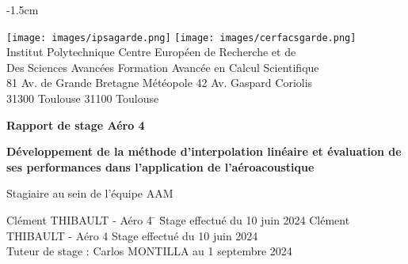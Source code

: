 \begin{titlepage}

    \changepage{3cm}%
           {}%
           {}%
           {}%
           {}%
           {-1.5cm}%
           {}%
           {}%
           {}%

    
    \parindent=0pt
    \texttt{[image: images/ipsagarde.png]}     \texttt{[image: images/cerfacsgarde.png]}\\
    Institut Polytechnique  Centre Européen de Recherche et de \\
    Des Sciences Avancées Formation Avancée en Calcul Scientifique\\
    81 Av. de Grande Bretagne Météopole 42 Av. Gaspard Coriolis\\
    31300 Toulouse 31100 Toulouse
    \vspace*{1.5cm}
    \begin{center}
        \bfseries\LARGE Rapport de stage Aéro 4
    \end{center}
    \hrulefill
    \begin{center}\bfseries\huge
        Développement de la méthode d'interpolation linéaire et évaluation de ses performances dans l'application de l'aéroacoustique
    \end{center}
    \begin{center}\huge
        Stagiaire au sein de l'équipe AAM
    \end{center}


    \begin{tabbing}
        Clément THIBAULT - Aéro 4 \= \hspace{6cm} \= Stage effectué du 10 juin 2024 \kill
        Clément THIBAULT - Aéro 4 \> \> Stage effectué du 10 juin 2024 \\
        Tuteur de stage : Carlos MONTILLA \> \> au 1 septembre 2024
    \end{tabbing}
    \vspace*{1cm}


\end{titlepage}